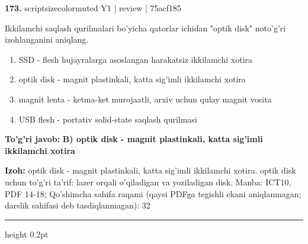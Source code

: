 \documentclass[10pt,a4paper]{article}
\begin{document}
{\bfseries\sffamily\color{ink} 173.} {scriptsizecolor{muted} Y1 | review | 75acf185}
\par
Ikkilamchi saqlash qurilmalari bo'yicha qatorlar ichidan "optik disk" noto'g'ri izohlanganini aniqlang.
\begin{enumerate}[label=\Alph*),leftmargin=9mm]
\item SSD - flesh hujayralarga asoslangan harakatsiz ikkilamchi xotira
\item optik disk - magnit plastinkali, katta sig'imli ikkilamchi xotira
\item magnit lenta - ketma-ket murojaatli, arxiv uchun qulay magnit vosita
\item USB flesh - portativ solid-state saqlash qurilmasi
\end{enumerate}
\begin{tcolorbox}[enhanced,breakable,colback=teal!4,colframe=teal!60!black,boxrule=0.45pt,arc=1.2mm,left=2.7mm,right=2.7mm,top=1.8mm,bottom=1.8mm,before skip=2mm,after skip=2mm]
{\bfseries\sffamily\color{teal}To'g'ri javob:} \textbf{B) optik disk - magnit plastinkali, katta sig'imli ikkilamchi xotira}
\par\smallskip
{\bfseries Izoh:} optik disk - magnit plastinkali, katta sig'imli ikkilamchi xotira. optik disk uchun to'g'ri ta'rif: lazer orqali o'qiladigan va yoziladigan disk. Manba: ICT10, PDF 14-18; Qo'shimcha sahifa raqami (qaysi PDFga tegishli ekani aniqlanmagan; darslik sahifasi deb tasdiqlanmagan): 32
\end{tcolorbox}
\vspace{2mm}\hrule height 0.2pt\vspace{3mm}
\end{document}
